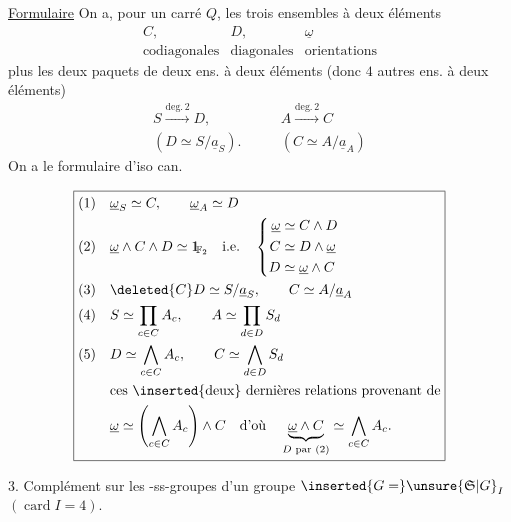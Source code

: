 \uline{Formulaire} On a, pour un carré $Q$, les trois ensembles à deux éléments
\[
\begin{array}{ccc}
 C,&D,&\underline\omega\\
 \text{codiagonales}&\text{diagonales}&\text{orientations}
\end{array}
\]
plus les deux paquets de deux ens. à deux éléments (donc $4$ autres ens. à deux éléments)
\[
\begin{aligned}
S\xrightarrow{\mathrm{deg.}\,2}D,\qquad & A\xrightarrow{\mathrm{deg.}\,2}C\\
(D\simeq S/\underline a_S).\qquad &(C\simeq A/\underline a_A)
\end{aligned}
\]
On a le formulaire d'iso can.



\[
\boxed{\begin{aligned}
(1)\quad &\underline\omega_S\simeq C,\qquad \underline\omega_A\simeq D\\
(2)\quad &\underline\omega\wedge C\wedge D\simeq\mathord{1\mkern-4mu\rule{.055em}{.66em}}_{\mathbb F_2}\quad\text{i.e.}\quad
\left\{\begin{aligned}
\underline\omega&\simeq C\wedge D\\ C&\simeq D\wedge\underline\omega\\ D&\simeq\underline\omega\wedge C
\end{aligned}\right.\\
(3)\quad &\deleted{C}D\simeq S/\underline a_S,\qquad C\simeq A/\underline a_A\\
(4)\quad &S\simeq\prod_{c\in C}A_c,\qquad A\simeq\prod_{d\in D} S_d\\
(5)\quad &D\simeq\bigwedge_{c\in C}A_c,\qquad C\simeq\bigwedge_{d\in D}S_d\\
&\text{ces \inserted{deux} dernières relations provenant de}\\
&\underline\omega\simeq\left(\bigwedge_{c\in C}A_c\right)\wedge C\quad
\text{d'où}\quad\underbrace{\underline\omega\wedge C}_{D\text{ par }(2)}
\simeq\bigwedge_{c\in C}A_c.
\end{aligned}}
\]

3. Complément sur les -ss-groupes  d'un groupe $\inserted{G=}\unsure{\mathfrak S|G}_I$ $(\operatorname{card} I=4)$.


